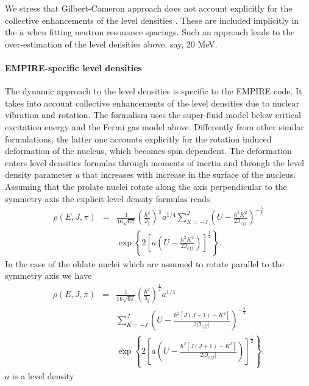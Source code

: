 We stress that Gilbert-Cameron approach does not account explicitly for the
collective enhancements of the level densities%
. These are included implicitly in the $%
\widetilde{a}$ when fitting neutron resonance spacings. Such an approach
leads to the over-estimation of the level densities above, say, 20 MeV.

\paragraph{EMPIRE-specific level densities}

The dynamic approach to the level densities%
 is specific to the EMPIRE code. It takes into
account collective enhancements of the level densities due to nuclear
vibration and rotation. The formalism uses the super-fluid model below
critical excitation energy and the Fermi gas model above. Differently from
other similar formulations, the latter one accounts explicitly for the
rotation induced deformation of the nucleus, which becomes spin dependent.
The deformation enters level densities formulas through moments of inertia
and through the level density parameter \emph{a} that increases with
increase in the surface of the nucleus. Assuming that the prolate nuclei
rotate along the axis perpendicular to the symmetry axis the explicit level
density formulas reads
\begin{eqnarray}
\rho(E,J,\pi) & = &
\frac{1}{16\sqrt{6\pi}}\left(\frac{\hbar^{2}}{\Im_{\Vert}}\right)^{\frac{1}{2%
}}a^{1/4}\sum_{K=-J}^{J}\left(U-\frac{\hbar^{2}K^{2}}{2\Im_{eff}}\right)^{-%
\frac{5}{4}}  \nonumber \\
& & \exp\left\{ 2\left[a\left(U-\frac{\hbar^{2}K^{2}}{2\Im_{eff}}\right)%
\right]^{\frac{1}{2}}\right\} .  \label{ro1}
\end{eqnarray}
In the case of the oblate nuclei which are assumed to rotate parallel to the
symmetry axis we have
\begin{eqnarray}
\rho(E,J,\pi) & = & \frac{1}{16\sqrt{6\pi}}\left(\frac{\hbar^{2}}{\Im_{\Vert}%
}\right)^{\frac{1}{2}}a^{1/4}  \nonumber \\
& & \sum_{K=-J}^{J}\left(U-\frac{\hbar^{2}\left[J\left(J+1\right)-K^{2}%
\right]}{2|\Im_{eff}|}\right)^{-\frac{5}{4}}  \label{ro2} \\
& & \exp\left\{ 2\left[a\left(U-\frac{\hbar^{2}\left[J\left(J+1\right)-K^{2}%
\right]}{2|\Im_{eff}|}\right)\right]^{\frac{1}{2}}\right\} .  \nonumber
\end{eqnarray}
$a$ is a level density%
